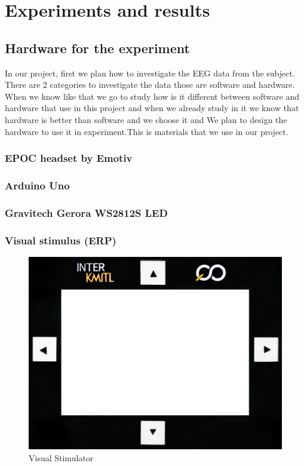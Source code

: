 \chapter{Experiments and results}

\label{ch:Experiments and results}

\setlength{\parindent}{4em}
\setlength{\parskip}{1em}
\renewcommand{\baselinestretch}{1.5}

\section{Hardware for the experiment}

In our project, first we plan how to investigate the EEG data from the subject. There are 2 categories to investigate the data those are software and hardware. When we know like that we go to study how is it different between software and hardware that use in this project and when we already study in it we know that hardware is better than software and we choose it and We plan to design the hardware to use it in experiment.This is materials that we use in our project.

\subsection{EPOC headset by Emotiv}

\subsection{Arduino Uno}

\subsection{Gravitech Gerora WS2812S LED}

\subsection{Visual stimulus (ERP)}
\begin{figure}[ht]
	\centering
	\includegraphics[width=\textwidth]{chapter7/frame_4.jpg}
	\caption{Visual Stimulator}
\end{figure}
